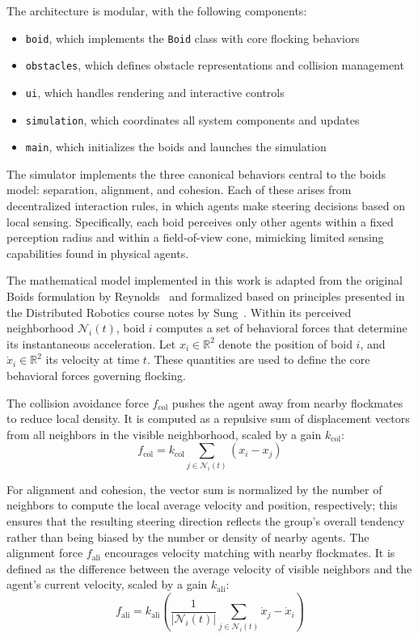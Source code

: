 \documentclass[12pt]{article}
\begin{document}
The architecture is modular, with the following components:
\begin{itemize}[nosep]
    \item \texttt{boid}, which implements the \texttt{Boid} class with core flocking behaviors
    \item \texttt{obstacles}, which defines obstacle representations and collision management
    \item \texttt{ui}, which handles rendering and interactive controls
    \item \texttt{simulation}, which coordinates all system components and updates
    \item \texttt{main}, which initializes the boids and launches the simulation
\end{itemize}

The simulator implements the three canonical behaviors central to the boids model: separation, alignment, and cohesion. Each of these arises from decentralized interaction rules, in which agents make steering decisions based on local sensing. Specifically, each boid perceives only other agents within a fixed perception radius and within a field-of-view cone, mimicking limited sensing capabilities found in physical agents.

The mathematical model implemented in this work is adapted from the original Boids formulation by Reynolds~\cite{reynolds1987flocks} and formalized based on principles presented in the Distributed Robotics course notes by Sung~\cite{sung2025distributed}. Within its perceived neighborhood \(\mathcal{N}_i(t)\), boid \(i\) computes a set of behavioral forces that determine its instantaneous acceleration. Let \(x_i \in \mathbb{R}^2\) denote the position of boid \(i\), and \(\dot{x}_i \in \mathbb{R}^2\) its velocity at time \(t\). These quantities are used to define the core behavioral forces governing flocking.

The collision avoidance force \(f_{\text{col}}\) pushes the agent away from nearby flockmates to reduce local density. It is computed as a repulsive sum of displacement vectors from all neighbors in the visible neighborhood, scaled by a gain \(k_{\text{col}}\):
\[ f_\text{col} = k_\text{col} \sum_{j \in \mathcal{N}_i(t)} (x_i - x_j) \]

For alignment and cohesion, the vector sum is normalized by the number of neighbors to compute the local average velocity and position, respectively; this ensures that the resulting steering direction reflects the group's overall tendency rather than being biased by the number or density of nearby agents. The alignment force \(f_\text{ali}\) encourages velocity matching with nearby flockmates. It is defined as the difference between the average velocity of visible neighbors and the agent’s current velocity, scaled by a gain \(k_\text{ali}\): 
\[ f_\text{ali} = k_\text{ali} \left( \frac{1}{|\mathcal{N}_i(t)|} \sum_{j \in \mathcal{N}_i(t)} \dot{x}_j - \dot{x}_i \right) \]
\end{document}

